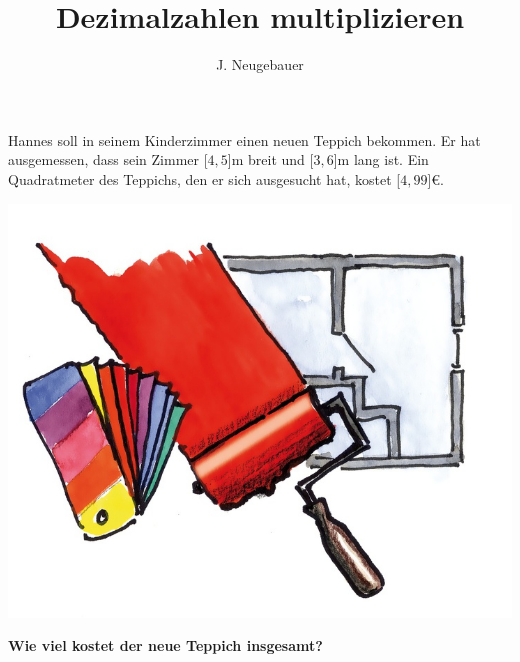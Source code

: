 \documentclass[11pt, a4paper]{scrartcl}
\author{J. Neugebauer}
\title{Dezimalzahlen multiplizieren}
\date{\Heute}
\begin{document}
	\LARGE

	Hannes soll in seinem Kinderzimmer einen neuen Teppich bekommen. Er hat ausgemessen, dass sein Zimmer \unit[$4,5$]{m} breit und \unit[$3,6$]{m} lang ist. Ein Quadratmeter des Teppichs, den er sich ausgesucht hat, kostet \unit[$4,99$]{\euro}.
	
	\begin{center}
	\includegraphics{6_15-Abb_Renovieren.jpg}
	
	\textbf{Wie viel kostet der neue Teppich insgesamt?}
	\end{center}
	
\end{document}
